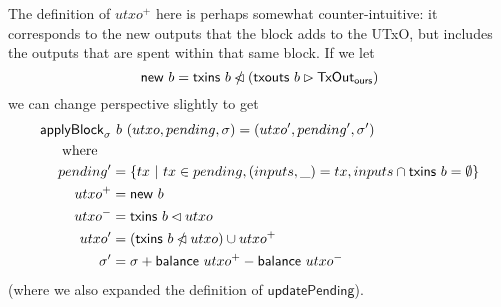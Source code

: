 \documentclass{article}
\newcommand{\restrictdom}{\lhd}
\newcommand{\subtractdom}{\mathbin{\slashed{\restrictdom}}}
\newcommand{\restrictrange}{\rhd}
\begin{document}
The definition of $utxo^+$ here is perhaps somewhat counter-intuitive: it
corresponds to the new outputs that the block adds to the UTxO, but includes the
outputs that are spent within that same block. If we let
%
\begin{equation*}
\mathsf{new} ~ b = \mathsf{txins} ~ b \subtractdom (\mathsf{txouts} ~ b \restrictrange \mathsf{TxOut_{ours}})
\end{equation*}
%
we can change perspective slightly to get
%
\begin{equation*}
\begin{split}
\mathsf{applyBlock}_\sigma & ~ b ~ (utxo, pending, \sigma) = (utxo^\prime, pending^\prime, \sigma^\prime) \\
\text{where} \quad \\
    pending^\prime & = \{ tx ~|~ tx \in pending, (inputs, \_) = tx, inputs \cap \mathsf{txins} ~ b = \emptyset \} \\
    utxo^+ & = \mathsf{new} ~ b \\
    utxo^- & = \mathsf{txins} ~ b \restrictdom utxo \\
    utxo^\prime & = (\mathsf{txins} ~ b \subtractdom utxo) \cup utxo^+ \\
    \sigma^\prime & = \sigma + \mathsf{balance} ~ utxo^+ - \mathsf{balance} ~ utxo^- \\
\end{split}
\end{equation*}
%
(where we also expanded the definition of $\mathsf{updatePending}$).
\end{document}
